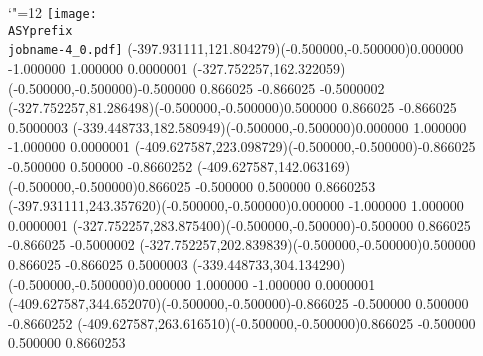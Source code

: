 \setlength{\unitlength}{1pt}
\makeatletter%
\let\ASYencoding\f@encoding%
\let\ASYfamily\f@family%
\let\ASYseries\f@series%
\let\ASYshape\f@shape%
\makeatother%
{\catcode`"=12%
\texttt{[image: \\ASYprefix\\jobname-4\_0.pdf]}%
}%
\color{ASYcolor}
\fontsize{12.000000}{14.400000}\selectfont
\usefont{\ASYencoding}{\ASYfamily}{\ASYseries}{\ASYshape}%
\ASYalignT(-397.931111,121.804279)(-0.500000,-0.500000){0.000000 -1.000000 1.000000 0.000000}{1}%
\color{ASYcolor}
\fontsize{12.000000}{14.400000}\selectfont
\ASYalignT(-327.752257,162.322059)(-0.500000,-0.500000){-0.500000 0.866025 -0.866025 -0.500000}{2}%
\color{ASYcolor}
\fontsize{12.000000}{14.400000}\selectfont
\ASYalignT(-327.752257,81.286498)(-0.500000,-0.500000){0.500000 0.866025 -0.866025 0.500000}{3}%
\color{ASYcolor}
\fontsize{12.000000}{14.400000}\selectfont
\ASYalignT(-339.448733,182.580949)(-0.500000,-0.500000){0.000000 1.000000 -1.000000 0.000000}{1}%
\color{ASYcolor}
\fontsize{12.000000}{14.400000}\selectfont
\ASYalignT(-409.627587,223.098729)(-0.500000,-0.500000){-0.866025 -0.500000 0.500000 -0.866025}{2}%
\color{ASYcolor}
\fontsize{12.000000}{14.400000}\selectfont
\ASYalignT(-409.627587,142.063169)(-0.500000,-0.500000){0.866025 -0.500000 0.500000 0.866025}{3}%
\color{ASYcolor}
\fontsize{12.000000}{14.400000}\selectfont
\ASYalignT(-397.931111,243.357620)(-0.500000,-0.500000){0.000000 -1.000000 1.000000 0.000000}{1}%
\color{ASYcolor}
\fontsize{12.000000}{14.400000}\selectfont
\ASYalignT(-327.752257,283.875400)(-0.500000,-0.500000){-0.500000 0.866025 -0.866025 -0.500000}{2}%
\color{ASYcolor}
\fontsize{12.000000}{14.400000}\selectfont
\ASYalignT(-327.752257,202.839839)(-0.500000,-0.500000){0.500000 0.866025 -0.866025 0.500000}{3}%
\color{ASYcolor}
\fontsize{12.000000}{14.400000}\selectfont
\ASYalignT(-339.448733,304.134290)(-0.500000,-0.500000){0.000000 1.000000 -1.000000 0.000000}{1}%
\color{ASYcolor}
\fontsize{12.000000}{14.400000}\selectfont
\ASYalignT(-409.627587,344.652070)(-0.500000,-0.500000){-0.866025 -0.500000 0.500000 -0.866025}{2}%
\color{ASYcolor}
\fontsize{12.000000}{14.400000}\selectfont
\ASYalignT(-409.627587,263.616510)(-0.500000,-0.500000){0.866025 -0.500000 0.500000 0.866025}{3}%
